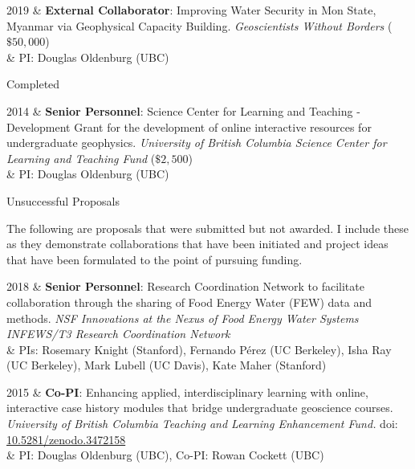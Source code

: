 \documentclass[a4paper, 11pt]{article}
\newcommand{\doi}[1]{doi: \href{https://doi.org/#1}{#1}}
\newcommand{\subheading}[1]{
    \vspace{0.5cm}
    {\Large #1}\\
    \vspace{-0.2cm}
}
\begin{document}
\begin{entryright}
2019 & \textbf{External Collaborator}: Improving Water Security in Mon State, Myanmar via Geophysical Capacity Building. \emph{Geoscientists Without Borders} ($\$50,000$) \\
& PI: Douglas Oldenburg (UBC) \\
\end{entryright}


\subheading{Completed}
\begin{entryright}
2014 & \textbf{Senior Personnel}: Science Center for Learning and Teaching - Development Grant for the development of online interactive resources for undergraduate geophysics. \emph{University of British Columbia Science Center for Learning and Teaching Fund} ($\$2,500$) \\
& PI: Douglas Oldenburg (UBC) \\
\end{entryright}

\subheading{Unsuccessful Proposals}

\noindent The following are proposals that were submitted but not awarded. I include these as they demonstrate collaborations that have been initiated and project ideas that have been formulated to the point of pursuing funding. \\

\begin{entryright}
2018 & \textbf{Senior Personnel}: Research Coordination Network to facilitate collaboration through the sharing of Food Energy Water (FEW) data and methods. \emph{NSF Innovations at the Nexus of Food Energy Water Systems INFEWS/T3 Research Coordination Network} \\
& PIs: Rosemary Knight (Stanford), Fernando P\'erez (UC Berkeley), Isha Ray (UC Berkeley), Mark Lubell (UC Davis), Kate Maher (Stanford) \\
\end{entryright}

\begin{entryright}
2015 & \textbf{Co-PI}: Enhancing applied, interdisciplinary learning with online, interactive case history modules that bridge undergraduate geoscience courses. \emph{University of British Columbia Teaching and Learning Enhancement Fund.} \doi{10.5281/zenodo.3472158} \\
& PI: Douglas Oldenburg (UBC), Co-PI: Rowan Cockett (UBC) \\
\end{entryright}
\end{document}
